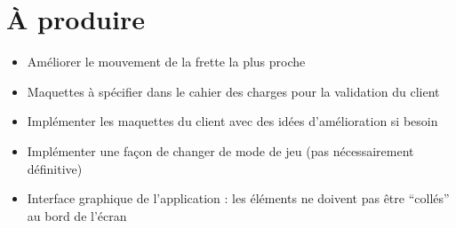 \documentclass{scrartcl}
\begin{document}
\section{À produire}
\begin{itemize}
	\item  Améliorer le mouvement de la frette la plus proche 
	\item  Maquettes à spécifier dans le cahier des charges pour la validation du client
	\item  Implémenter les maquettes du client avec des idées d'amélioration si besoin
	\item  Implémenter une façon de changer de mode de jeu (pas nécessairement définitive)
	\item  Interface graphique de l'application : les éléments ne doivent pas être \enquote{collés} au bord de l'écran
\end{itemize}
\end{document}
